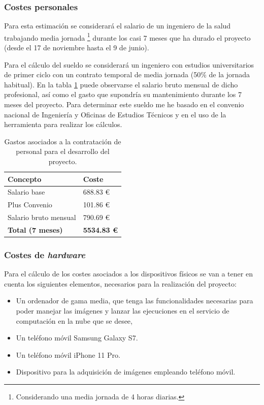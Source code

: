 \subsubsection{Costes personales}

Para esta estimación se considerará el salario de un ingeniero de la salud trabajando media jornada \footnote{Considerando una media jornada de 4 horas diarias.} durante los casi 7 meses que ha durado el proyecto (desde el 17 de noviembre hasta el 9 de junio). 

Para el cálculo del sueldo se considerará un ingeniero con estudios universitarios de primer ciclo con un contrato temporal de media jornada (50\% de la jornada habitual). En la tabla \ref{tab:cost_persona} puede observarse el salario bruto mensual de dicho profesional, así como el gasto que supondría su mantenimiento durante los 7 meses del proyecto. Para determinar este sueldo me he basado en el convenio nacional de Ingeniería y Oficinas de Estudios Técnicos y en el uso de la herramienta \cite{plan:nomina} para realizar los cálculos.

\begin{table}[]
\centering
\begin{tabular}{@{}ll@{}}
\toprule
\rowcolor[HTML]{C0C0C0} 
Concepto              & Coste     \\ \midrule
Salario base          & 688.83 €  \\
Plus Convenio         & 101.86 €  \\
Salario bruto mensual & 790.69 €  \\ \midrule
\textbf{Total (7 meses)}       &  \textbf{
5534.83 €} \\ \bottomrule
\end{tabular}
\caption{Gastos asociados a la contratación de personal para el desarrollo del proyecto.}
\label{tab:cost_persona}
\end{table}

\subsubsection{Costes de \textit{hardware}}

Para el cálculo de los costes asociados a los dispositivos físicos se van a tener en cuenta los siguientes elementos, necesarios para la realización del proyecto: 
\begin{itemize}
    \item Un ordenador de gama media, que tenga las funcionalidades necesarias para poder manejar las imágenes y lanzar las ejecuciones en el servicio de computación en la nube que se desee,
    \item Un teléfono móvil Samsung Galaxy S7.
    \item Un teléfono móvil iPhone 11 Pro.
    \item Dispositivo para la adquisición de imágenes empleando teléfono móvil.
\end{itemize}

